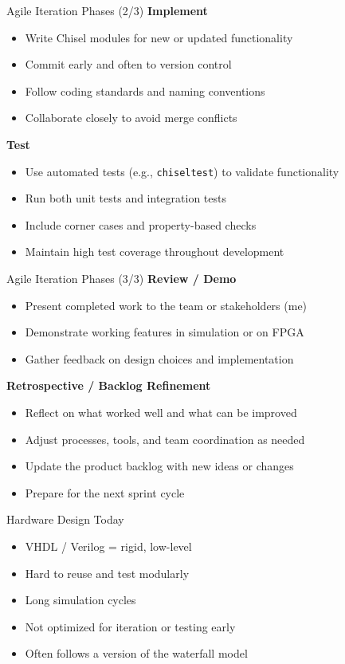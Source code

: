 \begin{frame}{Agile Iteration Phases (2/3)}
\textbf{Implement}
\begin{itemize}
    \item Write Chisel modules for new or updated functionality
    \item Commit early and often to version control
    \item Follow coding standards and naming conventions
    \item Collaborate closely to avoid merge conflicts
\end{itemize}

\medskip
\textbf{Test}
\begin{itemize}
    \item Use automated tests (e.g., \texttt{chiseltest}) to validate functionality
    \item Run both unit tests and integration tests
    \item Include corner cases and property-based checks
    \item Maintain high test coverage throughout development
\end{itemize}
\end{frame}

\begin{frame}{Agile Iteration Phases (3/3)}
\textbf{Review / Demo}
\begin{itemize}
    \item Present completed work to the team or stakeholders (me)
    \item Demonstrate working features in simulation or on FPGA
    \item Gather feedback on design choices and implementation
\end{itemize}

\medskip
\textbf{Retrospective / Backlog Refinement}
\begin{itemize}
    \item Reflect on what worked well and what can be improved
    \item Adjust processes, tools, and team coordination as needed
    \item Update the product backlog with new ideas or changes
    \item Prepare for the next sprint cycle
\end{itemize}
\end{frame}

\begin{frame}{Hardware Design Today}
\begin{itemize}
    \item VHDL / Verilog = rigid, low-level
    \item Hard to reuse and test modularly
    \item Long simulation cycles
    \item Not optimized for iteration or testing early
    \item Often follows a version of the waterfall model
\end{itemize}
\end{frame}

